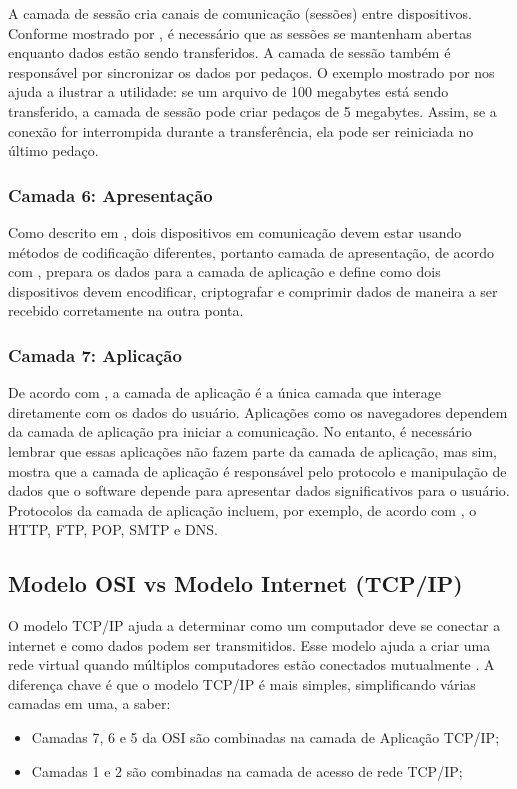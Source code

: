 \documentclass[tcc,capa]{texufpel}
\begin{document}
A camada de sessão cria canais de comunicação (sessões) entre dispositivos. Conforme mostrado por \citet{imperva}, é necessário que as sessões se mantenham abertas enquanto dados estão sendo transferidos. A camada de sessão também é responsável por sincronizar os dados por pedaços. O exemplo mostrado por \citet{cloudflare_layers} nos ajuda a ilustrar a utilidade: se um arquivo de 100 megabytes está sendo transferido, a camada de sessão pode criar pedaços de 5 megabytes. Assim, se a conexão for interrompida durante a transferência, ela pode ser reiniciada no último pedaço.

\subsubsection{Camada 6: Apresentação}

Como descrito em \citet{cloudflare_layers}, dois dispositivos em comunicação devem estar usando métodos de codificação diferentes, portanto camada de apresentação, de acordo com \citet{imperva}, prepara os dados para a camada de aplicação e define como dois dispositivos devem encodificar, criptografar e comprimir dados de maneira a ser recebido corretamente na outra ponta. 

\subsubsection{Camada 7: Aplicação}

De acordo com \citet{cloudflare_layers}, a camada de aplicação é a única camada que interage diretamente com os dados do usuário. Aplicações como os navegadores dependem da camada de aplicação pra iniciar a comunicação. No entanto, é necessário lembrar que essas aplicações não fazem parte da camada de aplicação, mas sim, \citet{cloudflare_layers} mostra que a camada de aplicação é responsável pelo protocolo e manipulação de dados que o software depende para apresentar dados significativos para o usuário. Protocolos da camada de aplicação incluem, por exemplo, de acordo com \citet{imperva}, o HTTP, FTP, POP, SMTP e DNS.


\subsection{Modelo OSI vs Modelo Internet (TCP/IP)}

O modelo TCP/IP ajuda a determinar como um computador deve se conectar a internet e como dados podem ser transmitidos. Esse modelo ajuda a criar uma rede virtual quando múltiplos computadores estão conectados mutualmente \cite{cloudflare_layers}. A diferença chave é que o modelo TCP/IP é mais simples, simplificando várias camadas em uma, a saber:
\begin{itemize}
    \item Camadas 7, 6 e 5 da OSI são combinadas na camada de Aplicação TCP/IP;
    \item Camadas 1 e 2 são combinadas na camada de acesso de rede TCP/IP;
\end{itemize}
\end{document}
